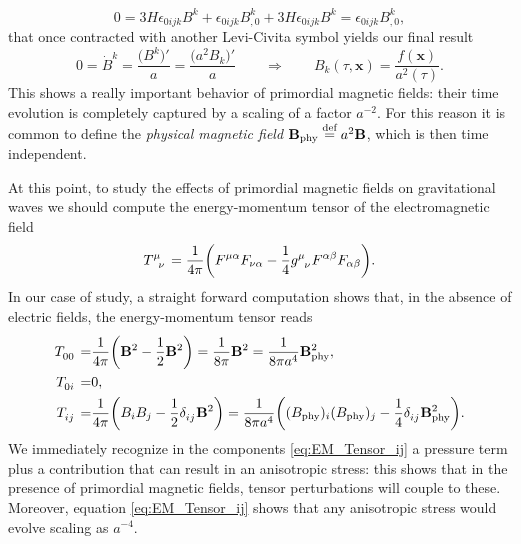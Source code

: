 {$$0=3H\epsilon_{0ijk}B^k+\epsilon_{0ijk}B^k_{,0}+3H\epsilon_{0ijk}B^k=\epsilon_{0ijk}B^k_{,0},$$
that once contracted with another Levi-Civita symbol yields our final result
\begin{equation}
    0=\dot B^k=\frac{\big(B^k\big)'}{a}=\frac{\big(a^2 B_k\big)'}{a}\qquad\Rightarrow\qquad B_k(\tau,\mathbf{x})=\frac{f(\mathbf{x})}{a^2(\tau)}.
\end{equation}
This shows a really important behavior of primordial magnetic fields: their time evolution is completely captured by a scaling of a factor $a^{-2}$. For this reason it is common to define the \emph{physical magnetic field} $\mathbf B_\text{phy}\stackrel{\text{def}}{=} a^2 \mathbf B$, which is then time independent. 

At this point, to study the effects of primordial magnetic fields on gravitational waves we should compute the energy-momentum tensor of the electromagnetic field
$$
\tensor{T}{^\mu_\nu}=\frac{1}{4\pi}\bigg(F^{\mu\alpha}F_{\nu\alpha}-\frac{1}{4}\tensor{g}{^\mu_\nu} F^{\alpha\beta}F_{\alpha\beta}\bigg).
$$
In our case of study, a straight forward computation shows that, in the absence of electric fields, the energy-momentum tensor reads
\begin{subequations}
    \begin{align}
    \tensor{T}{_0_0}=&\frac{1}{4\pi}\bigg(\mathbf B^2-\frac{1}{2}\mathbf B^2\bigg)=\frac{1}{8\pi}\mathbf B^2=\frac{1}{8\pi a^4}\mathbf B^2_\text{phy},\label{eq:EM_Tensor_00}\\
    \tensor{T}{_0_i}=&0\label{eq:EM_Tensor_0i},\\
    \tensor{T}{_i_j}=&\frac{1}{4\pi}\bigg(B_iB_j-\frac{1}{2}\tensor{\delta}{_i_j} \mathbf B^2\bigg)=\frac{1}{8\pi a^4}\bigg((B_\text{phy})_i(B_\text{phy})_j-\frac{1}{4}\tensor{\delta}{_i_j} \mathbf B_\text{phy}^2\bigg).\label{eq:EM_Tensor_ij}
\end{align}
\end{subequations}
We immediately recognize in the components \eqref{eq:EM_Tensor_ij} a pressure term plus a contribution that can result in an anisotropic stress: this shows that in the presence of primordial magnetic fields, tensor perturbations will couple to these. Moreover, equation \eqref{eq:EM_Tensor_ij} shows that any anisotropic stress would evolve scaling as $a^{-4}$. 

}
